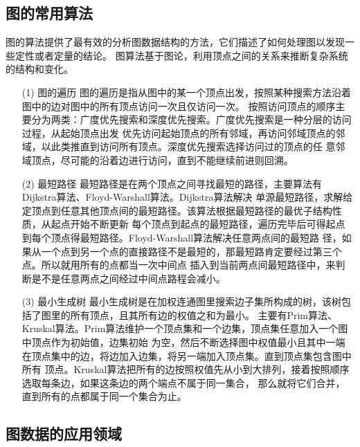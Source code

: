 \documentclass[master]{thesis-uestc}
\begin{document}
\subsection{图的常用算法}
    图的算法提供了最有效的分析图数据结构的方法，它们描述了如何处理图以发现一些定性或者定量的结论。
图算法基于图论，利用顶点之间的关系来推断复杂系统的结构和变化。
\begin{enumerate}
    \item[(1)] 图的遍历
    图的遍历是指从图中的某一个顶点出发，按照某种搜索方法沿着图中的边对图中的所有顶点访问一次且仅访问一次。
按照访问顶点的顺序主要分为两类：广度优先搜索和深度优先搜索。广度优先搜索是一种分层的访问过程，从起始顶点出发
优先访问起始顶点的所有邻域，再访问邻域顶点的邻域，以此类推直到访问所有顶点。深度优先搜索选择访问过的顶点的任
意邻域顶点，尽可能的沿着边进行访问，直到不能继续前进则回溯。
    
    \item[(2)] 最短路径
    最短路径是在两个顶点之间寻找最短的路径，主要算法有Dijkstra算法、Floyd-Warshall算法。Dijkstra算法解决
单源最短路径，求解给定顶点到任意其他顶点间的最短路径。该算法根据最短路径的最优子结构性质，从起点开始不断更新
每个顶点到起点的最短路径，遍历完毕后可得起点到每个顶点得最短路径。Floyd-Warshall算法解决任意两点间的最短路
径，如果从一个点到另一个点的直接路径不是最短的，那最短路肯定要经过第三个点。所以就用所有的点都当一次中间点
插入到当前两点间最短路径中，来判断是不是任意两点之间经过中间点路程会减小。

    \item[(3)] 最小生成树
    最小生成树是在加权连通图里搜索边子集所构成的树，该树包括了图里的所有顶点，且其所有边的权值之和为最小。
主要有Prim算法、Kruskal算法。Prim算法维护一个顶点集和一个边集，顶点集任意加入一个图中顶点作为初始值，边集初始
为空，然后不断选择图中权值最小且其中一端在顶点集中的边，将边加入边集，将另一端加入顶点集。直到顶点集包含图中所有
顶点。Kruskal算法把所有的边按照权值先从小到大排列，接着按照顺序选取每条边，如果这条边的两个端点不属于同一集合，
那么就将它们合并，直到所有的点都属于同一个集合为止。

\end{enumerate}

\subsection{图数据的应用领域}
\label{subsec:graph-app}
\end{document}
